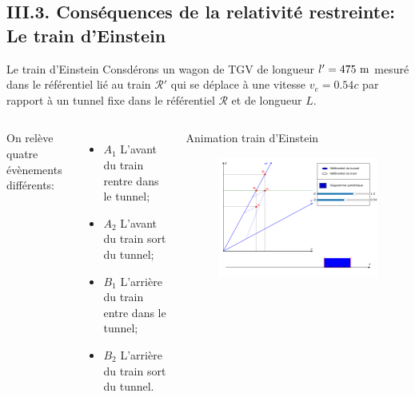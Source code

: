 \documentclass{beamer}
\begin{document}
\subsection{III.3. Conséquences de la relativité restreinte: Le train d'Einstein}
\begin{frame}{Le train d'Einstein}
    \vspace{-.4cm}
Consdérons un wagon de TGV de longueur $l' = 475~\rm m$ mesuré dans le référentiel lié au train $\mathcal{R}'$ qui se déplace à une vitesse $v_e=0.54c$ par rapport à un tunnel fixe dans le référentiel $\mathcal{R}$ et de longueur $L$.
\begin{columns}
    On relève quatre évènements différents: 
\begin{itemize}
    \item $A_1$ L'avant du train rentre dans le tunnel;
    \item $A_2$ L'avant du train sort du tunnel;
    \item $B_1$ L'arrière du train entre dans le tunnel;
    \item $B_2$ L'arrière du train sort du tunnel.
\end{itemize}
    \begin{block}{Animation train d'Einstein}
    \begin{figure}
        \centering
        \includegraphics[width = 1\textwidth]{TrainEinstein.png}
    \end{figure}
\end{block}
\end{columns}

\end{frame}
\end{document}
